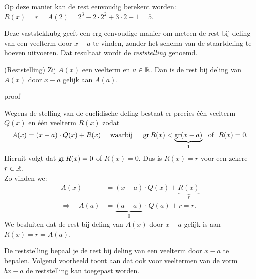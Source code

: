 \documentclass{ximera}
\begin{document}
Op deze manier kan de rest eenvoudig berekent worden: $R(x) = r = A(2) = 2^3 - 2 \cdot 2^2 + 3 \cdot 2 - 1 = 5$.



Deze vaststekkubg geeft een erg eenvoudige manier om meteen de rest bij deling van een veelterm door $x-a$ te vinden, zonder het schema van de staartdeling te hoeven uitvoeren. Dat resultaat wordt de \textit{ reststelling} genoemd.

\begin{theorem} (Reststelling)
Zij $A(x)$ een veelterm en $a \in \mathbb{R}$. Dan is de rest bij deling van $A(x)$ door $x-a$ gelijk aan $A(a)$.
\end{theorem} 


\begin{expandable}{proof}{}

Wegens de stelling van de euclidische deling bestaat er precies  één veelterm $Q(x)$ en één veelterm $R(x)$ zodat
\[
A(x) = (x-a)\cdot Q(x) + R(x) \quad \text{ waarbij } \quad \operatorname{gr} R(x) < \underbrace{\operatorname{gr} (x-a)}_{1} \,\, \text{ of } \,\, R(x) = 0.
\]
Hieruit volgt dat $\operatorname{gr} R(x) = 0$ of $R(x) = 0$. Dus is $R(x) = r$ voor een zekere $r \in \mathbb{R}$. \\
Zo vinden we:
\begin{align*}
A(x) & = (x-a) \cdot Q(x) + \underbrace{R(x)}_{r} \\
\Rightarrow \quad A(a) & = \underbrace{(a-a)}_{0} \cdot \, Q(a) + r = r. 
\end{align*}
We besluiten dat de rest bij deling van $A(x)$ door $x-a$ gelijk is aan $R(x) = r = A(a)$. 

\end{expandable}


De reststelling bepaal je de rest bij deling van een veelterm door $x-a$ te bepalen. Volgend voorbeeld toont aan dat ook voor veeltermen van de vorm $bx-a$ de reststelling kan toegepast worden. 
\end{document}
